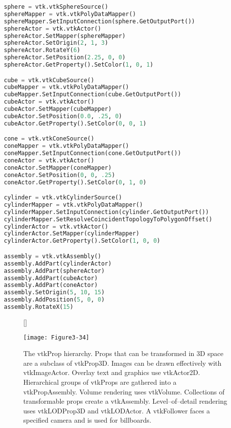 \begin{lstlisting}[language=Python, caption={Part of assembly.py}, escapechar=\$]
sphere = vtk.vtkSphereSource()
sphereMapper = vtk.vtkPolyDataMapper()
sphereMapper.SetInputConnection(sphere.GetOutputPort())
sphereActor = vtk.vtkActor()
sphereActor.SetMapper(sphereMapper)
sphereActor.SetOrigin(2, 1, 3)
sphereActor.RotateY(6)
sphereActor.SetPosition(2.25, 0, 0)
sphereActor.GetProperty().SetColor(1, 0, 1)

cube = vtk.vtkCubeSource()
cubeMapper = vtk.vtkPolyDataMapper()
cubeMapper.SetInputConnection(cube.GetOutputPort())
cubeActor = vtk.vtkActor()
cubeActor.SetMapper(cubeMapper)
cubeActor.SetPosition(0.0, .25, 0)
cubeActor.GetProperty().SetColor(0, 0, 1)

cone = vtk.vtkConeSource()
coneMapper = vtk.vtkPolyDataMapper()
coneMapper.SetInputConnection(cone.GetOutputPort())
coneActor = vtk.vtkActor()
coneActor.SetMapper(coneMapper)
coneActor.SetPosition(0, 0, .25)
coneActor.GetProperty().SetColor(0, 1, 0)

cylinder = vtk.vtkCylinderSource()
cylinderMapper = vtk.vtkPolyDataMapper()
cylinderMapper.SetInputConnection(cylinder.GetOutputPort())
cylinderMapper.SetResolveCoincidentTopologyToPolygonOffset()
cylinderActor = vtk.vtkActor()
cylinderActor.SetMapper(cylinderMapper)
cylinderActor.GetProperty().SetColor(1, 0, 0)

assembly = vtk.vtkAssembly()
assembly.AddPart(cylinderActor)
assembly.AddPart(sphereActor)
assembly.AddPart(cubeActor)
assembly.AddPart(coneActor)
assembly.SetOrigin(5, 10, 15)
assembly.AddPosition(5, 0, 0)
assembly.RotateX(15)
\end{lstlisting}

\begin{figure}[!htb]
[\FBwidth]
{\caption{The vtkProp hierarchy. Props that can be transformed in 3D space are a subclass of vtkProp3D. Images can be drawn effectively with vtkImageActor. Overlay text and graphics use vtkActor2D. Hierarchical groups of vtkProps are gathered into a vtkPropAssembly. Volume rendering uses vtkVolume. Collections of transformable props create a vtkAssembly. Level--of--detail rendering uses vtkLODProp3D and vtkLODActor. A vtkFollower faces a specified camera and is used for billboards.}\label{fig:Figure3-34}}
{\texttt{[image: Figure3-34]}}
\end{figure}

